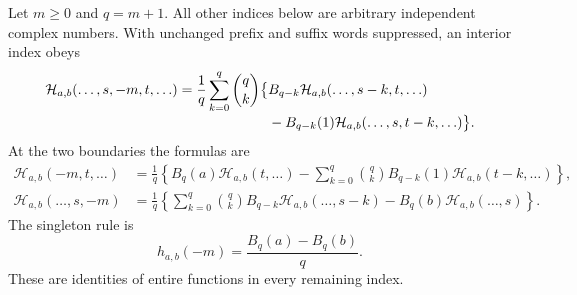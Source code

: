 \begin{theorem}
\label{harm:local}
Let $m\ge0$ and $q=m+1$. All other indices below are arbitrary
independent complex numbers. With unchanged prefix and suffix words
suppressed, an interior index obeys
\begin{align}
 \mathcal H_{a,b}(\ldots,s,-m,t,\ldots)
  =\frac1q\sum_{k=0}^q\binom qk\bigl\{
   &B_{q-k}\mathcal H_{a,b}(\ldots,s-k,t,\ldots)\notag\\[-2pt]
   &-B_{q-k}(1)\mathcal H_{a,b}(\ldots,s,t-k,\ldots)
   \bigr\}.
 \label{harm:interior}
\end{align}
At the two boundaries the formulas are
\begin{align}
 \mathcal H_{a,b}(-m,t,\ldots)
 &=\frac1q\left\{B_q(a)\mathcal H_{a,b}(t,\ldots)
  -\sum_{k=0}^q\binom qk B_{q-k}(1)
                        \mathcal H_{a,b}(t-k,\ldots)\right\},
 \label{harm:top}\\
 \mathcal H_{a,b}(\ldots,s,-m)
 &=\frac1q\left\{\sum_{k=0}^q\binom qk B_{q-k}
                  \mathcal H_{a,b}(\ldots,s-k)
                     -B_q(b)\mathcal H_{a,b}(\ldots,s)\right\}.
 \label{harm:bottom}
\end{align}
The singleton rule is
\begin{equation}
             h_{a,b}(-m)=\frac{B_q(a)-B_q(b)}q.
 \label{harm:singleton}
\end{equation}
These are identities of entire functions in every remaining index.
\end{theorem}


